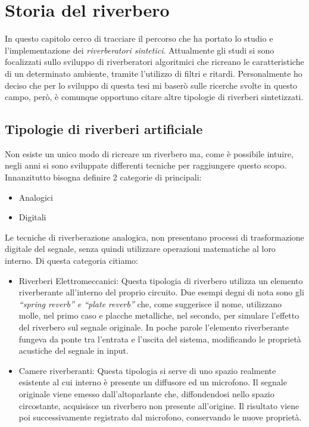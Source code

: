 
\chapter{Storia del riverbero}
\label{chp:Storia del riverbero}

In questo capitolo cerco di tracciare il percorso che ha portato lo studio e l’implementazione dei \textit{riverberatori sintetici}. Attualmente gli studi si sono focalizzati sullo sviluppo di riverberatori algoritmici che ricreano le caratteristiche di un determinato ambiente, tramite l’utilizzo di filtri e ritardi. Personalmente ho deciso che per lo sviluppo di questa tesi mi baserò sulle ricerche svolte in questo campo, però, è comunque opportuno citare altre tipologie di riverberi sintetizzati.

\section{Tipologie di riverberi artificiale}

Non esiste un unico modo di ricreare un riverbero ma, come è possibile intuire, negli anni si sono sviluppate differenti tecniche per raggiungere questo scopo.
Innanzitutto bisogna definire 2 categorie di principali:

\begin{itemize}
\item Analogici
\item Digitali
\end{itemize}

Le tecniche di riverberazione analogica, non presentano processi di trasformazione digitale del segnale, senza quindi utilizzare operazioni matematiche al loro interno.
Di questa categoria citiamo:

\begin{itemize}
\item Riverberi Elettromeccanici: Questa tipologia di riverbero utilizza un elemento riverberante all’interno del proprio circuito. Due esempi degni di nota sono gli \emph{“spring reverb” e “plate reverb”} che, come suggerisce il nome, utilizzano molle, nel primo caso e placche metalliche, nel secondo, per simulare l’effetto del riverbero sul segnale originale. In poche parole l’elemento riverberante fungeva da ponte tra l’entrata e l’uscita del sistema, modificando le proprietà acustiche del segnale in input.
\item Camere riverberanti: Questa tipologia si serve di uno spazio realmente esistente al cui interno è presente un diffusore ed un microfono. Il segnale originale viene emesso dall’altoparlante che, diffondendosi nello spazio circostante, acquisisce un riverbero non presente all’origine. Il risultato viene poi successivamente registrato dal microfono, conservando le nuove proprietà.
\end{itemize}

